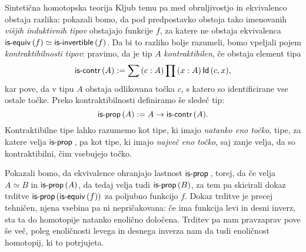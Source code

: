 \documentclass[a4paper, slovene]{article}
\begin{document}
\begin{section}{Sintetična homotopska teorija}
  Kljub temu pa med obrnljivostjo in ekvivalenco obstaja
  razlika: pokazali bomo, da pod predpostavko obstoja tako imenovanih
  \emph{višjih induktivnih tipov} obstajajo funkcije \(f\), za katere ne obstaja
  ekvivalenca \(\textnormal{\textsf{is-equiv}}\,(f) \simeq \textnormal{\textsf{is-invertible}}\,(f)\). Da bi to razliko bolje razumeli, bomo vpeljali
  pojem \emph{kontraktibilnosti tipov}: pravimo, da je tip \(A\) \emph{kontraktibilen},
  če obstaja element tipa
  \[\textnormal{\textsf{is-contr}}\,(A) := \sum \left( c : A \right) \prod \left( x : A \right) \textnormal{\textsf{Id}}\,(c, x),\]
  kar pove, da v tipu \(A\) obstaja odlikovana točka \(c\), s katero so identificirane
  vse ostale točke.
  Preko kontraktibilnosti definiramo še sledeč tip:
  \[\textnormal{\textsf{is-prop}}\,(A) := A \to \textnormal{\textsf{is-contr}}\,(A).\]
  Kontraktibilne tipe lahko razumemo kot tipe, ki imajo \emph{natanko eno točko},
  tipe, za katere velja \(\textnormal{\textsf{is-prop}}\,\), pa kot tipe, ki imajo \emph{največ eno točko}, saj
  zanje velja, da so kontraktibilni, čim vsebujejo točko.

  Pokazali bomo, da ekvivalence ohranjajo lastnost \(\textnormal{\textsf{is-prop}}\,\), torej, da
  če velja \(A \simeq B\) in \(\textnormal{\textsf{is-prop}}\,(A)\), da tedaj velja tudi \(\textnormal{\textsf{is-prop}}\,(B)\), za tem
  pa skicirali dokaz trditve \(\textnormal{\textsf{is-prop}}\,(\textnormal{\textsf{is-equiv}}\,(f))\) za poljubno funkcijo \(f\).
  Dokaz trditve je precej tehničen, njena vsebina pa ni nepričakovana:
  če ima funkcija levi in desni inverz, sta ta do homotopije natanko enolično določena.
  Trditev pa nam pravzaprav pove še več,
  poleg enoličnosti levega in desnega inverza nam da tudi enoličnost homotopij, ki to
  potrjujeta.





\end{section}

\printbibliography
\end{document}
